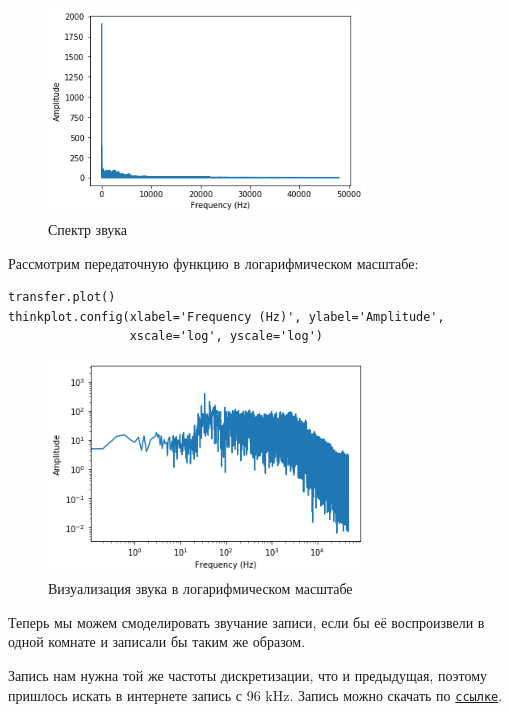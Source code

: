 \documentclass[a4paper,12pt]{report}
\begin{document}
\begin{figure}[H]
        \centering
        \includegraphics[width=0.75\textwidth]{lab10_fig2_2.png}
        \caption{Спектр звука}
        \label{fig:lab10_fig2_2}
\end{figure}

Рассмотрим передаточную функцию в логарифмическом масштабе:

\begin{lstlisting}[caption=Визуализация звука в логарифмическом масштабе]
transfer.plot()
thinkplot.config(xlabel='Frequency (Hz)', ylabel='Amplitude',
                 xscale='log', yscale='log')
\end{lstlisting}

\begin{figure}[H]
        \centering
        \includegraphics[width=0.75\textwidth]{lab10_fig2_3.png}
        \caption{Визуализация звука в логарифмическом масштабе}
        \label{fig:lab10_fig2_3}
\end{figure}

Теперь мы можем смоделировать звучание записи, если бы её воспроизвели в одной комнате и записали бы таким же образом.

Запись нам нужна той же частоты дискретизации, что и предыдущая, поэтому пришлось искать в интернете запись с 96 kHz. Запись можно скачать по \href{https://freesound.org/people/shakaharu/sounds/88498/}{\texttt{ссылке}}.
\end{document}
